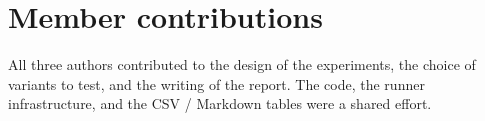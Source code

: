 \documentclass[10pt]{article}
\begin{document}
\section*{Member contributions}

All three authors contributed to the design of the experiments,
the choice of variants to test, and the writing of the report. The
code, the runner infrastructure, and the CSV / Markdown tables
were a shared effort.





\end{document}
